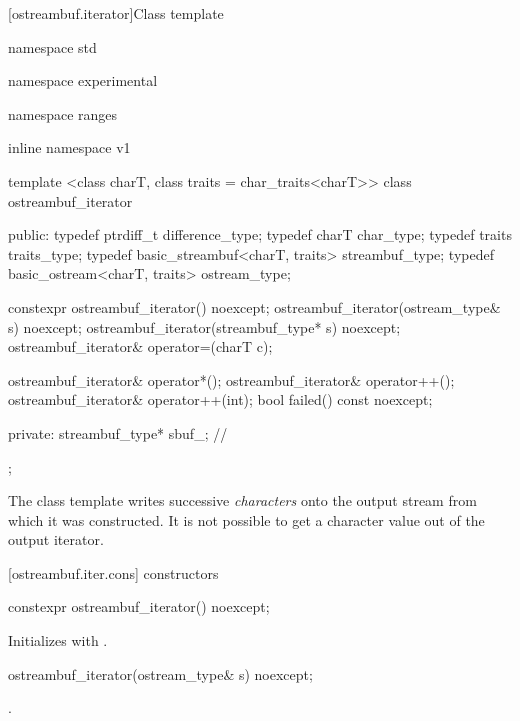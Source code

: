 [ostreambuf.iterator]{Class template }

%
\begin{codeblock}
namespace std { namespace experimental { namespace ranges { inline namespace v1 {
  template <class charT, class traits = char_traits<charT>>
  class ostreambuf_iterator {
  public:
    typedef ptrdiff_t                      difference_type;
    typedef charT                          char_type;
    typedef traits                         traits_type;
    typedef basic_streambuf<charT, traits> streambuf_type;
    typedef basic_ostream<charT, traits>   ostream_type;

    constexpr ostreambuf_iterator() noexcept;
    ostreambuf_iterator(ostream_type& s) noexcept;
    ostreambuf_iterator(streambuf_type* s) noexcept;
    ostreambuf_iterator& operator=(charT c);

    ostreambuf_iterator& operator*();
    ostreambuf_iterator& operator++();
    ostreambuf_iterator& operator++(int);
    bool failed() const noexcept;

  private:
    streambuf_type* sbuf_;                // \expos
  };
}}}}
\end{codeblock}

\pnum
The
class template
writes successive
\textit{characters}
onto the output stream from which it was constructed.
It is not possible to get a character value out of the output iterator.

[ostreambuf.iter.cons]{ constructors}

%
\begin{itemdecl}
constexpr ostreambuf_iterator() noexcept;
\end{itemdecl}

\begin{itemdescr}
\pnum
\effects
Initializes  with .
\end{itemdescr}

%
\begin{itemdecl}
ostreambuf_iterator(ostream_type& s) noexcept;
\end{itemdecl}

\begin{itemdescr}
\pnum
\requires
{}.
\end{itemdescr}

